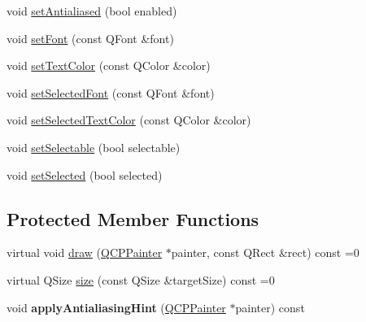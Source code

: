 \begin{DoxyCompactItemize}
\item 
void \hyperlink{classQCPAbstractLegendItem_a158dc34e221b304a3e3c577b9824a88d}{set\-Antialiased} (bool enabled)
\item 
void \hyperlink{classQCPAbstractLegendItem_a409c53455d8112f71d70c0c43eb10265}{set\-Font} (const Q\-Font \&font)
\item 
void \hyperlink{classQCPAbstractLegendItem_a6ebace6aaffaedcdab2d74e88acc2d1e}{set\-Text\-Color} (const Q\-Color \&color)
\item 
void \hyperlink{classQCPAbstractLegendItem_a91db5aee48617a9d3206e61376807365}{set\-Selected\-Font} (const Q\-Font \&font)
\item 
void \hyperlink{classQCPAbstractLegendItem_a4d01d008ee1a5bfe9905b0397a421936}{set\-Selected\-Text\-Color} (const Q\-Color \&color)
\item 
void \hyperlink{classQCPAbstractLegendItem_a9913ef48730551b696e7f98a2391c599}{set\-Selectable} (bool selectable)
\item 
void \hyperlink{classQCPAbstractLegendItem_a6eed93b0ab99cb3eabb043fb08179c2b}{set\-Selected} (bool selected)
\end{DoxyCompactItemize}
\subsection*{Protected Member Functions}
\begin{DoxyCompactItemize}
\item 
virtual void \hyperlink{classQCPAbstractLegendItem_a2ef6ce9d39f166b387d505f7aa660c3c}{draw} (\hyperlink{classQCPPainter}{Q\-C\-P\-Painter} $\ast$painter, const Q\-Rect \&rect) const =0
\item 
virtual Q\-Size \hyperlink{classQCPAbstractLegendItem_ab17c533ecf8ed0262c50eecd14c32b1f}{size} (const Q\-Size \&target\-Size) const =0
\item 
\hypertarget{classQCPAbstractLegendItem_a71291e0a2983bddb821289cb6954831c}{void {\bfseries apply\-Antialiasing\-Hint} (\hyperlink{classQCPPainter}{Q\-C\-P\-Painter} $\ast$painter) const }\label{classQCPAbstractLegendItem_a71291e0a2983bddb821289cb6954831c}

\end{DoxyCompactItemize}
